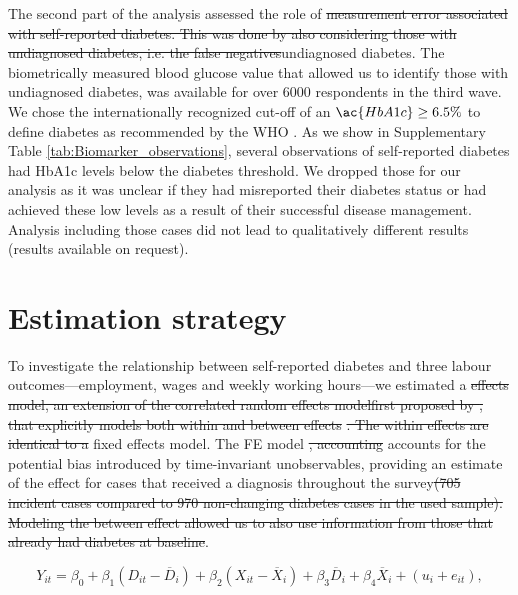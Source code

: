 \documentclass[12pt,english]{article}
\providecommand{\DIFaddtex}[1]{{\protect\color{blue}#1}} %
\providecommand{\DIFdeltex}[1]{{\protect\color{red}\sout{#1}}}                      %
\providecommand{\DIFaddbegin}{} %
\providecommand{\DIFaddend}{} %
\providecommand{\DIFdelbegin}{} %
\providecommand{\DIFdelend}{} %
\providecommand{\DIFadd}[1]{\texorpdfstring{\DIFaddtex{#1}}{#1}} %
\providecommand{\DIFdel}[1]{\texorpdfstring{\DIFdeltex{#1}}{}} %
\begin{document}
The second part of the analysis assessed the role of \DIFdelbegin \DIFdel{measurement error associated with self-reported diabetes. This was done by also considering those with undiagnosed diabetes, i.e. the false negatives}\DIFdelend \DIFaddbegin \DIFadd{undiagnosed diabetes}\DIFaddend . The biometrically measured blood glucose value that allowed us to identify those with undiagnosed diabetes, was available for over 6000 respondents in the third wave. \DIFaddbegin \DIFadd{We chose the internationally recognized cut-off of an $\ac{HbA1c} \geq 6.5\%$ to define diabetes as recommended by the }\ac{WHO} \parencite{WorldHealthOrganization2011}\DIFadd{.  As we show in Supplementary Table \ref{tab:Biomarker_observations}, several observations of self-reported diabetes had }\ac{HbA1c} \DIFadd{levels below the diabetes threshold. We dropped those for our analysis as it was unclear if they had misreported their diabetes status or had achieved these low levels as a result of their successful disease management. Analysis including those cases did not lead to qualitatively different results (results available on request).
}\DIFaddend 



\section{\label{sec:Estimation Strategy}Estimation strategy}

To investigate the relationship between self-reported diabetes and three labour outcomes---employment, wages and weekly working hours---we estimated a \DIFdelbegin %
\DIFdel{effects model, an extension of the correlated random effects modelfirst proposed by \textcite{Mundlak1978}, that explicitly models both within and between effects }%
\DIFdel{. The within effects are identical to a }\DIFdelend \DIFaddbegin \DIFadd{fixed effects model. The }\DIFaddend \ac{FE} model \DIFdelbegin \DIFdel{, accounting }\DIFdelend \DIFaddbegin \DIFadd{accounts }\DIFaddend for the potential bias introduced by time-invariant unobservables, providing an estimate of the effect for cases that received a diagnosis throughout the survey\DIFdelbegin \DIFdel{(705 incident cases compared to 970 non-changing diabetes cases in the used sample). Modeling the between effect allowed us to also use information from those that already had diabetes at baseline}\DIFdelend .


\begin{equation}
Y_{it}=\beta_{0}+\beta_{1}(D_{it}-\overline{D}_{i})+\beta_{2}(X_{it}-\overline{X}_i)+\beta_{3}\overline{D}_{i}+\beta_{4}\overline{X}_i+(u_{i}+e_{it}),\label{eq:cha4_employed}
\end{equation}
\end{document}
